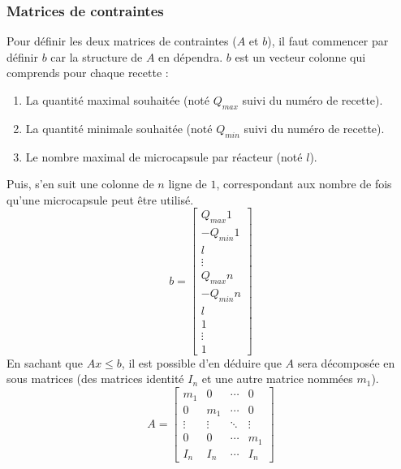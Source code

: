 \subsubsection{Matrices de contraintes}\label{subsubsection:contraintes}
Pour définir les deux matrices de contraintes ($A$ et $b$), il faut commencer par définir $b$ car la structure de $A$ en dépendra.
$b$ est un vecteur colonne qui comprends pour chaque recette :
\begin{enumerate}
    \item La quantité maximal souhaitée (noté $Q_{max}$ suivi du numéro de recette).
    \item La quantité minimale souhaitée (noté $Q_{min}$ suivi du numéro de recette).
    \item Le nombre maximal de microcapsule par réacteur (noté $l$).
\end{enumerate}
Puis, s'en suit une colonne de $n$ ligne de $1$, correspondant aux nombre de fois qu'une microcapsule peut être utilisé.
\begin{equation}
    b = \left[
        \begin{array}{c}
            Q_{max}1\\
            -Q_{min}1\\
            l\\
            \vdots\\
            Q_{max}n\\
            -Q_{min}n\\
            l\\
                1 \\
                \vdots \\
                1
        \end{array}
    \right]
\end{equation}
En sachant que $Ax \leq b$, il est possible d'en déduire que $A$ sera décomposée en sous matrices (des matrices identité $I_n$ et une autre matrice nommées $m_1$).
\begin{equation}
    A = \left[\begin{array}{cccc}
        m_1    & 0       & \cdots & 0\\
        0      & m_1     & \cdots & 0\\
        \vdots & \vdots  & \ddots & \vdots \\
        0      & 0       & \cdots &  m_1 \\
        I_n    & I_n     & \cdots &  I_n
    \end{array}\right]
\end{equation}
